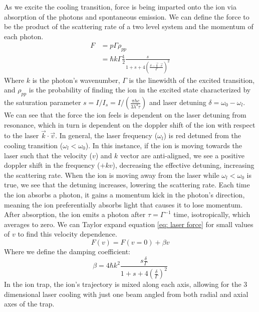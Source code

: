 As we excite the cooling transition, force is being imparted onto the ion via absorption of the photons and spontaneous emission. We can define the force to be the product of the scattering rate of a two level system and the momentum of each photon.
\begin{align}
	F & = p \Gamma \rho_{pp} \nonumber \\
	& = \hbar k \Gamma \frac{1}{2} \frac{s}{1+s+4\left(\frac{\delta-\vec{k}\cdot \vec{v}}{\Gamma}\right)^2} \label{eq: laser force}
\end{align}
Where $k$ is the photon's wavenumber, $\Gamma$ is the linewidth of the excited transition, and $\rho_{pp}$ is the probability of finding the ion in the excited  state characterized by the saturation parameter $s = I/I_s=I/(\frac{\pi h c}{3 \lambda^3 \tau})$ and laser detuning $\delta=\omega_0-\omega_l$. We can see that the force the ion feels is dependent on the laser detuning from resonance, which in turn is dependent on the doppler shift of the ion with respect to the laser $\vec{k} \cdot \vec{v}$. In general, the laser frequency ($\omega_l$) is red detuned from the cooling transition ($\omega_l < \omega_0$). In this instance, if the ion is moving towards the laser such that the velocity ($v$) and $k$ vector are anti-aligned, we see a positive doppler shift in the frequency ($+kv$), decreasing the effective detuning, increasing the scattering rate. When the ion is moving away from the laser while $\omega_l < \omega_0$ is true, we see that the detuning increases, lowering the scattering rate. Each time the ion absorbs a photon, it gains a momentum kick in the photon's direction, meaning the ion preferentially absorbs light that causes it to lose momentum. After absorption, the ion emits a photon after $\tau=\Gamma^{-1}$ time, isotropically, which averages to zero. We can Taylor expand equation \ref{eq: laser force} for small values of $v$ to find this velocity dependence.
\begin{equation*}
	F(v) = F(v=0) + \beta v
\end{equation*}
Where we define the damping coefficient:
\begin{equation*}
	\beta= 4 \hbar k^2 \frac{s \frac{\delta}{\Gamma}}{1+s+4\left(\frac{\delta}{\Gamma}\right)^2}
\end{equation*}
In the ion trap, the ion's trajectory is mixed along each axis, allowing for the 3 dimensional laser cooling with just one beam angled from both radial and axial axes of the trap.